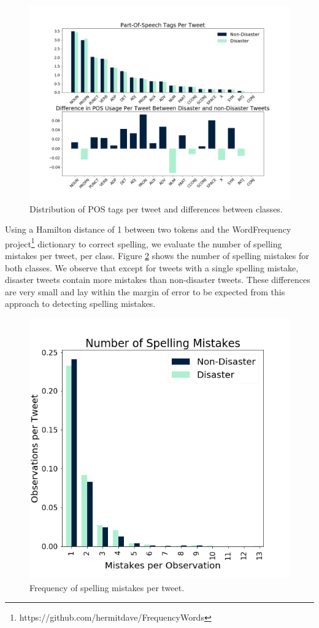 \documentclass[journal, ]{IEEEtran}
\let\MYoriglatexcaption\caption
\renewcommand{\caption}[2][\relax]{\MYoriglatexcaption[#2]{#2}}
\begin{document}
\begin{figure}[hbt!]
  \centering
  \includegraphics[width=\linewidth]{../figures/part_of_speech.png}
  \caption{Distribution of POS tags per tweet and differences between classes.}
  \label{fig:part_of_speech}
\end{figure}

Using a Hamilton distance of 1 between two tokens and the WordFrequency
project\footnote{https://github.com/hermitdave/FrequencyWords} dictionary to
correct spelling, we evaluate the number of spelling mistakes per tweet, per
class. Figure \ref{fig:spelling_mistakes} shows the number of spelling
mistakes for both classes. We observe that except for tweets with a single
spelling mistake, disaster tweets contain more mistakes than non-disaster
tweets. These differences are very small and lay within the margin of error to
be expected from this approach to detecting spelling mistakes.

\begin{figure}[hbt!]
  \centering
  \includegraphics[width=0.9\linewidth]{../figures/spelling_mistakes.png}
  \caption{Frequency of spelling mistakes per tweet.}
  \label{fig:spelling_mistakes}
\end{figure}
\end{document}
